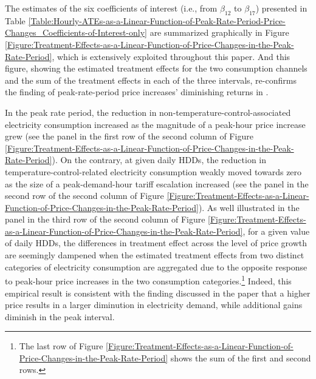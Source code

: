The estimates of the six coefficients of interest (i.e., from $\beta_{12}$ to $\beta_{17}$) presented in Table \ref{Table:Hourly-ATEs-as-a-Linear-Function-of-Peak-Rate-Period-Price-Changes_Coefficients-of-Interest-only} are summarized graphically in Figure \ref{Figure:Treatment-Effects-as-a-Linear-Function-of-Price-Changes-in-the-Peak-Rate-Period}, which is extensively exploited throughout this paper. And this figure, showing the estimated treatment effects for the two consumption channels and the sum of the treatment effects in each of the three intervals, re-confirms the finding of peak-rate-period price increases' diminishing returns in \cite{Peaking-Interest:How-Awareness-Drives-the-Effectiveness-of-Time-of-Use-Electricity-Pricing_Prest_2020}. 

In the peak rate period, the reduction in non-temperature-control-associated electricity consumption increased as the magnitude of a peak-hour price increase grew (see the panel in the first row of the second column of Figure \ref{Figure:Treatment-Effects-as-a-Linear-Function-of-Price-Changes-in-the-Peak-Rate-Period}). On the contrary, at given daily HDDs, the reduction in temperature-control-related electricity consumption weakly moved towards zero as the size of a peak-demand-hour tariff escalation increased (see the panel in the second row of the second column of Figure \ref{Figure:Treatment-Effects-as-a-Linear-Function-of-Price-Changes-in-the-Peak-Rate-Period}). As well illustrated in the panel in the third row of the second column of Figure \ref{Figure:Treatment-Effects-as-a-Linear-Function-of-Price-Changes-in-the-Peak-Rate-Period}, for a given value of daily HDDs, the differences in treatment effect across the level of price growth are seemingly dampened when the estimated treatment effects from two distinct categories of electricity consumption are aggregated due to the opposite response to peak-hour price increases in the two consumption categories.\footnote{The last row of Figure \ref{Figure:Treatment-Effects-as-a-Linear-Function-of-Price-Changes-in-the-Peak-Rate-Period} shows the sum of the first and second rows.} Indeed, this empirical result is consistent with the finding discussed in the paper that a higher price results in a larger diminution in electricity demand, while additional gains diminish in the peak interval. 

